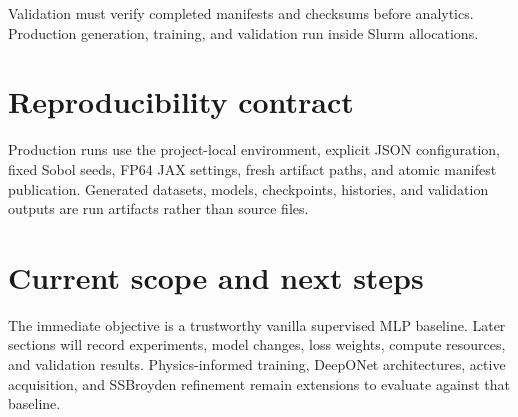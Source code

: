 \documentclass[11pt]{article}
\begin{document}
Validation must verify completed manifests and checksums before analytics.
Production generation, training, and validation run inside Slurm allocations.

\section{Reproducibility contract}

Production runs use the project-local environment, explicit JSON
configuration, fixed Sobol seeds, FP64 JAX settings, fresh artifact paths,
and atomic manifest publication.  Generated datasets, models, checkpoints,
histories, and validation outputs are run artifacts rather than source files.

\section{Current scope and next steps}

The immediate objective is a trustworthy vanilla supervised MLP baseline.
Later sections will record experiments, model changes, loss weights, compute
resources, and validation results.  Physics-informed training, DeepONet
architectures, active acquisition, and SSBroyden refinement remain extensions
to evaluate against that baseline.
\end{document}
